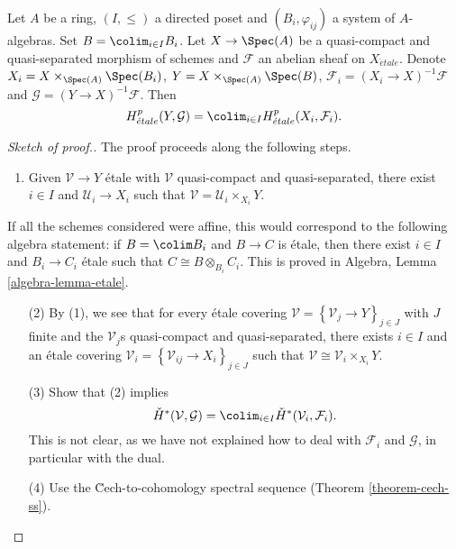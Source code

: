 \begin{theorem}
\label{theorem-directed-colimit-cohomology}
Let $A$ be a ring, $(I, \leq)$ a directed poset and $(B_i, \varphi_{ij})$ a
system of $A$-algebras. Set $B=\colim_{i\in I} B_i$. Let $X \to \Spec(A)$
be a quasi-compact and quasi-separated morphism of schemes and
$\mathcal{F}$ an abelian sheaf on $X_{\acute{e}tale}$. Denote
$X_i = X \times_{\Spec(A)} \Spec(B_i)$,
$Y = X \times_{\Spec(A)} \Spec(B)$,
$\mathcal{F}_i = (X_i\to X)^{-1}\mathcal{F}$ and
$\mathcal{G} = (Y \to X)^{-1}\mathcal{F}$. Then
$$
H_{\acute{e}tale}^p(Y, \mathcal{G}) =
\colim_{i\in I} H_{\acute{e}tale}^p (X_i, \mathcal{F}_i).
$$
\end{theorem}

\begin{proof}[Sketch of proof.]
The proof proceeds along the following steps.
\begin{enumerate}
\item Given $\mathcal{V}\to Y$ \'etale with $\mathcal{V}$ quasi-compact and
quasi-separated, there exist $i\in I$ and $\mathcal{U}_i \to X_i$ such that
$\mathcal{V} = \mathcal{U}_i \times_{X_i} Y$.
\end{enumerate}
If all the schemes considered were affine, this would correspond to the
following algebra statement: if $B=\colim B_i$ and $B\to C$ is \'etale,
then there exist $i\in I$ and $B_i\to C_i$ \'etale such that $C \cong B
\otimes_{B_i} C_i$. This is proved in Algebra, Lemma \ref{algebra-lemma-etale}.
\begin{enumerate}
\item[(2)]
By (1), we see that for every \'etale covering $\mathcal{V} =
\left\{\mathcal{V}_j\to Y\right\}_{j\in J}$ with $J$ finite and the
$\mathcal{V}_j$s quasi-compact and quasi-separated, there exists $i\in I$ and
an \'etale covering $\mathcal{V}_i = \left\{\mathcal{V}_{ij} \to X_i
\right\}_{j\in J}$ such that $\mathcal{V} \cong \mathcal{V}_i \times_{X_i} Y$.
\item[(3)]
Show that (2) implies
$$
\check H^*(\mathcal{V}, \mathcal{G})=\colim_{i\in I}\check
H^*(\mathcal{V}_i, \mathcal{F}_i).
$$
This is not clear, as we have not explained how to deal with $\mathcal{F}_i$
and $\mathcal{G}$, in particular with the dual.
\item[(4)] Use the \u Cech-to-cohomology spectral sequence
(Theorem \ref{theorem-cech-ss}).
\end{enumerate}
\end{proof}





